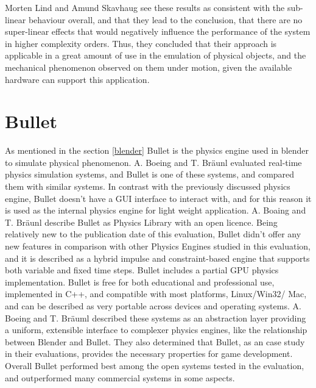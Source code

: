 \documentclass[
	12pt, 
	a4paper, 
]{article}
\begin{document}
	Morten Lind and Amund Skavhaug see these results as consistent with the sub-linear behaviour overall, and that they lead to the conclusion, that there are no super-linear effects that would negatively influence the performance of the system in higher complexity orders. Thus, they concluded that their approach is applicable in a great amount of use in the emulation of physical objects, and the mechanical phenomenon observed on them under motion, given the available hardware can support this application\cite{lind2012using}.
	\section{Bullet}\label{bullet}
	As mentioned in the section \ref{blender} Bullet is the physics engine used in blender to simulate physical phenomenon. A. Boeing and T. Bräunl evaluated real-time physics simulation systems, and Bullet is one of these systems, and compared them with similar systems. In contrast with the previously discussed physics engine, Bullet doesn't have a GUI interface to interact with, and for this reason it is used as the internal physics engine for light weight application. A. Boaing and T. Bräunl describe Bullet as Physics Library with an open licence. Being relatively new to the publication date of this evaluation, Bullet didn't offer any new features in comparison with other Physics Engines studied in this evaluation, and it is described as a hybrid impulse and constraint-based engine that supports both variable and fixed time steps. Bullet includes a partial GPU physics implementation\cite{boeing2007evaluation}.\newline
	Bullet is free for both educational and professional use, implemented in C++, and compatible with most platforms, Linux/Win32/ Mac\cite{boeing2007evaluation}, and can be described as very portable across devices and operating systems.\newline
	A. Boeing and T. Bräuml described these systems as an abstraction layer providing a uniform, extensible interface to complexer physics engines, like the relationship between Blender and Bullet. They also determined that Bullet, as an case study in their evaluations, provides the necessary properties for game development. Overall Bullet performed best among the open systems tested in the evaluation, and outperformed many commercial systems in some aspects\cite{boeing2007evaluation}.\newline 
\end{document}
